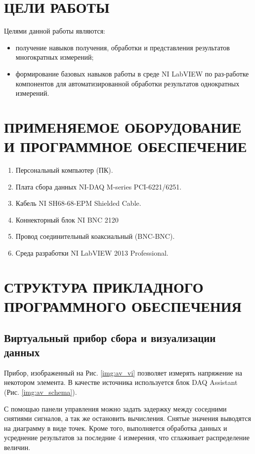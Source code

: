 \documentclass[a4paper,14pt]{article}
\begin{document}

\tableofcontents
\pagebreak

\section{ЦЕЛИ РАБОТЫ}
Целями данной работы являются:

\begin{itemize}
    \item получение навыков получения, обработки и представления результатов многократных измерений;
    \item формирование базовых навыков работы в среде NI LabVIEW по раз-работке компонентов для автоматизированной обработки результатов однократных измерений.
\end{itemize}

\section{ПРИМЕНЯЕМОЕ ОБОРУДОВАНИЕ И ПРОГРАММНОЕ ОБЕСПЕЧЕНИЕ}

\begin{enumerate}
    \item    Персональный компьютер (ПК).
    \item    Плата сбора данных NI-DAQ M-series PCI-6221/6251.
    \item    Кабель NI SH68-68-EPM Shielded Cable.
    \item    Коннекторный блок NI BNC 2120
    \item    Провод соединительный коаксиальный (BNC-BNC).
    \item    Среда разработки NI LabVIEW 2013 Professional.
\end{enumerate}


\section{СТРУКТУРА ПРИКЛАДНОГО     ПРОГРАММНОГО ОБЕСПЕЧЕНИЯ}
\subsection{Виртуальный прибор сбора и визуализации данных}

Прибор, изображенный на Рис. \ref{img:av_vi} позволяет измерять напряжение на некотором элемента.
В качестве источника используется блок DAQ Assistant (Рис. \ref{img:av_schema}).

С помощью панели управления можно задать задержку между соседними снятиями сигналов, а так же остановить вычисления.
Снятые значения выводятся на диаграмму в виде точек.
Кроме того, выполняется обработка данных и усреднение результатов за последние 4 измерения, что сглаживает распределение величин.
\end{document}
